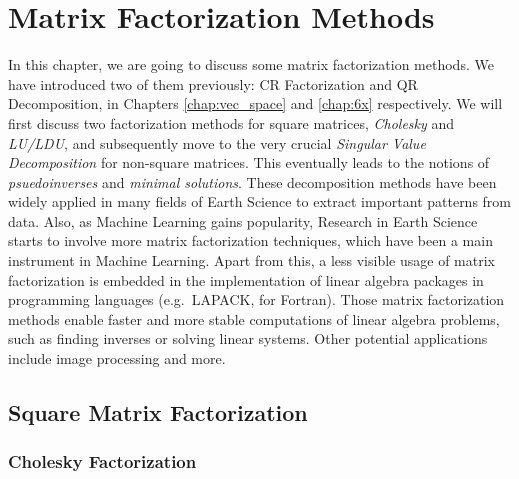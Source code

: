 \chapter{Matrix Factorization Methods}

In this chapter, we are going to discuss some matrix factorization methods. We have introduced two of them previously: CR Factorization and QR Decomposition, in Chapters \ref{chap:vec_space} and \ref{chap:6x} respectively. We will first discuss two factorization methods for square matrices, \textit{Cholesky} and \textit{LU/LDU}, and subsequently move to the very crucial \textit{Singular Value Decomposition} for non-square matrices. This eventually leads to the notions of \textit{psuedoinverses} and \textit{minimal solutions}. These decomposition methods have been widely applied in many fields of Earth Science to extract important patterns from data. Also, as Machine Learning gains popularity, Research in Earth Science starts to involve more matrix factorization techniques, which have been a main instrument in Machine Learning. Apart from this, a less visible usage of matrix factorization is embedded in the implementation of linear algebra packages in programming languages (e.g.\ LAPACK, for Fortran). Those matrix factorization methods enable faster and more stable computations of linear algebra problems, such as finding inverses or solving linear systems. Other potential applications include image processing and more.

\section{Square Matrix Factorization}
\subsection{Cholesky Factorization}

